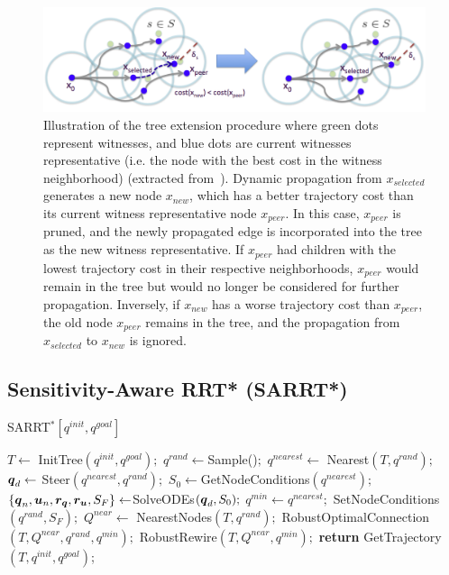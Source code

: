\begin{figure} [t!]
    \centering
    \includegraphics[width=0.95\linewidth]{figures/samp/sst.png} 
    \caption{Illustration of the  tree extension procedure where green dots represent witnesses, and blue dots are current witnesses representative (i.e. the node with the best cost in the witness neighborhood) (extracted from~\cite{cSST}).
    Dynamic propagation from $x_{selected}$ generates a new node $x_{new}$, which has a better trajectory cost than its current witness representative node $x_{peer}$.
    In this case, $x_{peer}$ is pruned, and the newly propagated edge is incorporated into the tree as the new witness representative.
    If $x_{peer}$ had children with the lowest trajectory cost in their respective neighborhoods, $x_{peer}$ would remain in the tree but would no longer be considered for further propagation. 
    Inversely, if $x_{new}$ has a worse trajectory cost than $x_{peer}$, the old node $x_{peer}$ remains in the tree, and the propagation from $x_{selected}$ to $x_{new}$ is ignored.}%
    \label{fig:sst}%
\end{figure}

\subsection{Sensitivity-Aware RRT* (SARRT*)}\label{sec:sarrt*}

\begin{algorithm}[htp]
    \caption{SARRT$^* [q^{init}, q^{goal}]$}\label{alg:SARRT*}
    \begin{algorithmic}[1]
        \State $T \gets$ InitTree$({q^{init}, q^{goal}});$
            \State $q^{rand} \gets $Sample()$;$
            \State $q^{nearest} \gets$ Nearest$(T,{q^{rand}});$
            \State $\boldsymbol{q}_d \gets$ Steer$({q^{nearest}},{q^{rand}});$
            \State $S_0 \gets $GetNodeConditions$({q^{nearest}});$
            \State $\left \{\boldsymbol{q}_n, \boldsymbol{u}_n, \boldsymbol{r_q}, \boldsymbol{r_u}, S_F \right \}  \gets $SolveODEs$(\boldsymbol{q}_d, S_0);$
                \State $q^{min} \gets q^{nearest};$
                \State SetNodeConditions$({q^{rand}}, S_{F});$
                \State $Q^{near} \gets$ NearestNodes$(T,{q^{rand}});$
                \State RobustOptimalConnection$(T, Q^{near}, q^{rand}, q^{min});$
                \State RobustRewire$(T, Q^{near}, q^{min});$
            \EndIf
        \EndWhile
        \State \textbf{return} GetTrajectory$(T, q^{init}, q^{goal})$;
    \end{algorithmic}
\end{algorithm}

